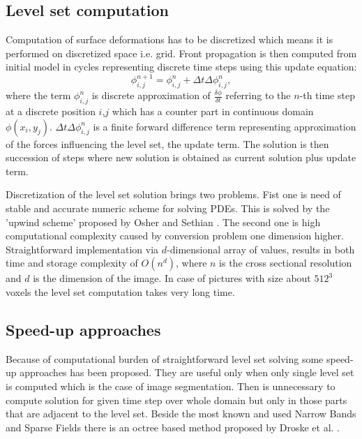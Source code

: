 \subsection{Level set computation}

Computation of surface deformations has to be discretized which means it is performed on discretized space i.e. grid.
Front propagation is then computed from initial model in cycles representing discrete time steps using this update equation:
\begin{equation}
\label{deformEqApprox}
\phi_{i,j}^{n+1} = \phi_{i,j}^{n} + \Delta t \Delta \phi_{i,j}^{n},
\end{equation}
where the term $\phi_{i,j}^{n}$ is discrete approximation of $\frac{\delta\phi}{\delta t}$ referring to the $n$-th time step at a discrete position $i$,$j$ which has a counter part in continuous domain $\phi(x_i, y_j)$.
$\Delta t \Delta \phi_{i,j}^{n}$ is a finite forward difference term representing approximation of the forces influencing the level set, the update term.
The solution is then succession of steps where new solution is obtained as current solution plus update term.

\par
Discretization of the level set solution brings two problems.
Fist one is need of stable and accurate numeric scheme for solving PDEs.
This is solved by the 'upwind scheme' proposed by Osher and Sethian \cite{sethianLS}.
The second one is high computational complexity caused by conversion problem one dimension higher.
Straightforward implementation via $d$-dimensional array of values, results in both time and storage complexity of $O(n^d)$, where $n$ is the cross sectional resolution and $d$ is the dimension of the image.
In case of pictures with size about $512^3$ voxels the level set computation takes very long time.

\subsection{Speed-up approaches}

\par
Because of computational burden of straightforward level set solving some speed-up approaches has been proposed.
They are useful only when only single level set is computed which is the case of image segmentation.
Then is unnecessary to compute solution for given time step over whole domain but only in those parts that are adjacent to the level set.
Beside the most known and used Narrow Bands and Sparse Fields there is an octree based method proposed by Droske et al. \cite{octree}.

